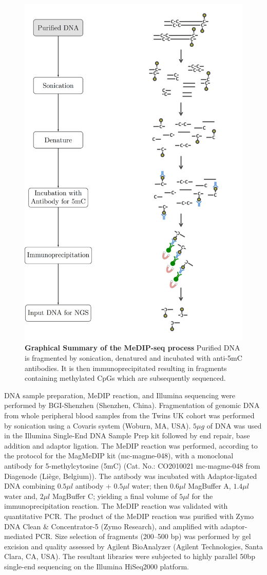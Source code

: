 \documentclass[
]{book}
\begin{document}
\begin{figure}

{\centering \includegraphics[width=0.6\linewidth]{figs/MeDIPseqReaction} 

}

\caption{\textbf{Graphical Summary of the MeDIP-seq process} Purified DNA is fragmented by sonication, denatured and incubated with anti-5mC antibodies. It is then immunoprecipitated resulting in fragments containing methylated CpGs which are subsequently sequenced.}\label{fig:MeDIPseqReaction}
\end{figure}



DNA sample preparation, MeDIP reaction, and Illumina sequencing were performed by BGI-Shenzhen (Shenzhen, China).
Fragmentation of genomic DNA from whole peripheral blood samples from the Twins UK cohort was performed by sonication using a Covaris system (Woburn, MA, USA).
\(5\mu g\) of DNA was used in the Illumina Single-End DNA Sample Prep kit followed by end repair, base addition and adaptor ligation.
The MeDIP reaction was performed, according to the protocol for the MagMeDIP kit (mc-magme-048), with a monoclonal antibody for 5-methylcytosine (5mC) (Cat. No.: CO2010021 mc-magme-048 from Diagenode (Liège, Belgium)).
The antibody was incubated with Adaptor-ligated DNA combining \(0.5 \mu l\) antibody + \(0.5 \mu l\) water; then \(0.6 \mu l\) MagBuffer A, \(1.4 \mu l\) water and, \(2 \mu l\) MagBuffer C; yielding a final volume of \(5 \mu l\) for the immunoprecipitation reaction.
The MeDIP reaction was validated with quantitative PCR.
The product of the MeDIP reaction was purified with Zymo DNA Clean \& Concentrator-5 (Zymo Research), and amplified with adaptor-mediated PCR.
Size selection of fragments (200--500 bp) was performed by gel excision and quality assessed by Agilent BioAnalyzer (Agilent Technologies, Santa Clara, CA, USA).
The resultant libraries were subjected to highly parallel 50bp single-end sequencing on the Illumina HiSeq2000 platform.
\end{document}
